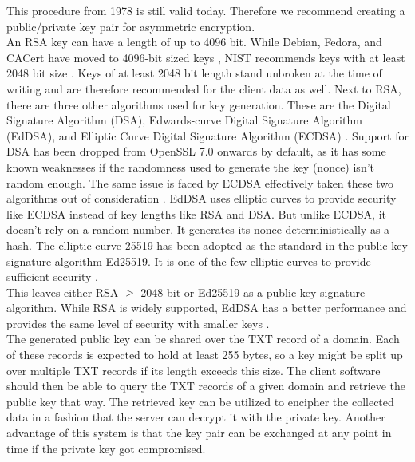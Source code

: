         This procedure from 1978 is still valid today. Therefore we recommend creating a  public/private key pair for asymmetric encryption.\\
        An RSA key can have a length of up to 4096 bit. While Debian, Fedora, and CACert have moved to 4096-bit sized keys \cite{pocock_rsa_nodate}, NIST recommends keys with at least 2048 bit size \cite{barker_transitioning_2019}. Keys of at least 2048 bit length stand unbroken at the time of writing and are therefore recommended for the client data as well. 
        Next to RSA, there are three other algorithms used for key generation. 
        These are the Digital Signature Algorithm (DSA), Edwards-curve Digital Signature Algorithm (EdDSA), and Elliptic Curve Digital Signature Algorithm (ECDSA) \cite{mody_comparing_2020}.
        Support for DSA has been dropped from OpenSSL 7.0 onwards by default, as it has some known weaknesses if the randomness used to generate the key (nonce) isn't random enough. The same issue is faced by ECDSA effectively taken these two algorithms out of consideration \cite{miller_ecdsa_2020}.
        EdDSA uses elliptic curves to provide security like ECDSA instead of key lengths like RSA and DSA. But unlike ECDSA, it doesn't rely on a random number. It generates its nonce deterministically as a hash. The elliptic curve 25519 has been adopted as the standard
        in the public-key signature algorithm Ed25519. It is one of the few elliptic curves to provide sufficient security \cite{mody_comparing_2020}.\\
        This leaves either RSA $\geq$ 2048 bit or Ed25519 as a public-key signature algorithm.
        While RSA is widely supported, EdDSA has a better performance and provides the same level of security with smaller keys \cite{mody_comparing_2020}.\\
        
        The generated public key can be shared over the TXT record of a domain. Each of these records is expected to hold at least 255 bytes, so a key might be split up over multiple TXT records if its length exceeds this size.
        The client software should then be able to query the TXT records of a given domain and retrieve the public key that way.
        The retrieved key can be utilized to encipher the collected data in a fashion that the server can decrypt it with the private key. Another advantage of this system is that the key pair can be exchanged at any point in time if the private key got compromised.
        
